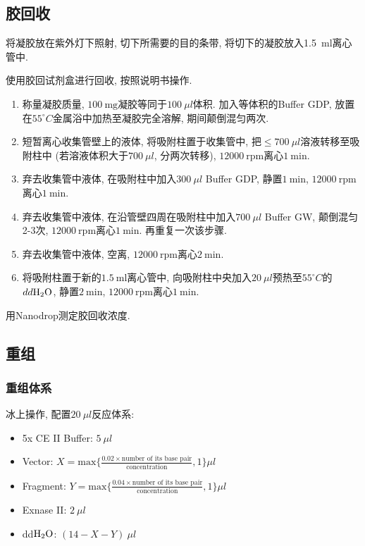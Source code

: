 \documentclass{article}
\begin{document}
\subsection{胶回收}

将凝胶放在紫外灯下照射, 切下所需要的目的条带, 将切下的凝胶放入1.5\ ml离心管中.

使用胶回试剂盒进行回收, 按照说明书操作.
\begin{enumerate}
    \item 称量凝胶质量, $100\ \mbox{mg}$凝胶等同于$100\ \mu l$体积. 加入等体积的Buffer GDP, 放置在$55^\circ C$金属浴中加热至凝胶完全溶解, 期间颠倒混匀两次.
    \item 短暂离心收集管壁上的液体, 将吸附柱置于收集管中, 把$\leq 700\ \mu l$溶液转移至吸附柱中 (若溶液体积大于$700\ \mu l$, 分两次转移), $12000\ \mbox{rpm}$离心$1\ \mbox{min}$.
    \item 弃去收集管中液体, 在吸附柱中加入$300\ \mu l$ Buffer GDP, 静置$1\ \mbox{min}$, $12000\ \mbox{rpm}$离心$1\ \mbox{min}$.
    \item 弃去收集管中液体, 在沿管壁四周在吸附柱中加入$700\ \mu l$ Buffer GW, 颠倒混匀2-3次, $12000\ \mbox{rpm}$离心$1\ \mbox{min}$. 再重复一次该步骤.
    \item 弃去收集管中液体, 空离, $12000\ \mbox{rpm}$离心$2\ \mbox{min}$.
    \item 将吸附柱置于新的$1.5\ \mbox{ml}$离心管中, 向吸附柱中央加入$20\ \mu l$预热至$55^\circ C$的$dd\ce{H2O}$, 静置$2\ \mbox{min}$, $12000\ \mbox{rpm}$离心$1\ \mbox{min}$.
\end{enumerate}

用Nanodrop测定胶回收浓度.

\subsection{重组}

\subsubsection{重组体系}
冰上操作, 配置$20\ \mu l$反应体系:

\begin{itemize}
    \item 5x CE II Buffer: $5\ \mu l$
    \item Vector: $X = \mbox{max} \{\frac{0.02 \times \mbox{number of its base pair}}{\mbox{concentration}}, 1 \} \mu l$
    \item Fragment: $Y = \mbox{max} \{\frac{0.04 \times \mbox{number of its base pair}}{\mbox{concentration}}, 1 \} \mu l$
    \item Exnase II: $2\ \mu l$
    \item dd$\ce{H2O}$: $(14 - X - Y)\ \mu l$
\end{itemize}
\end{document}
